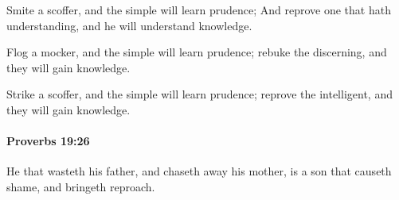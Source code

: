			\begin{versebox}
					\item[BHS] 
					\item[ASV] Smite a scoffer, and the simple will learn prudence; And reprove one that hath understanding, and he will understand knowledge.
					\item[NIV] Flog a mocker, and the simple will learn prudence; rebuke the discerning, and they will gain knowledge.
					\item[NRSV] Strike a scoffer, and the simple will learn prudence; reprove the intelligent, and they will gain knowledge.
			\end{versebox}

		\paragraph{Proverbs 19:26} %
			\label{PROVERBS-19-26}

			He that wasteth his father, and chaseth away his mother, is a son that causeth shame, and bringeth reproach.

